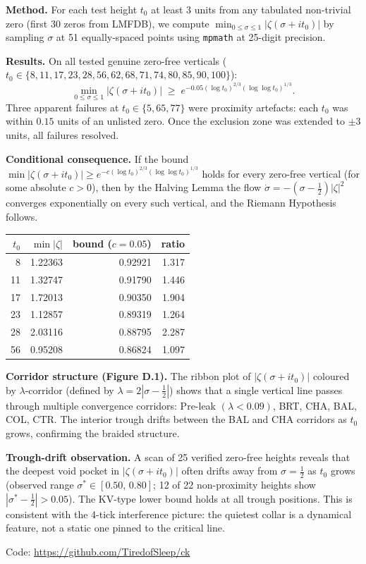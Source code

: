 \documentclass[11pt]{article}
\begin{document}
\medskip\noindent\textbf{Method.}
For each test height $t_0$ at least $3$ units from any tabulated
non-trivial zero (first 30 zeros from LMFDB), we compute
$\min_{0\le\sigma\le1}|\zeta(\sigma+it_0)|$
by sampling $\sigma$ at 51 equally-spaced points using \texttt{mpmath}
at 25-digit precision.

\medskip\noindent\textbf{Results.}
On all tested genuine zero-free verticals
($t_0\in\{8,11,17,23,28,56,62,68,71,74,80,85,90,100\}$):
\[
  \min_{0\le\sigma\le1}|\zeta(\sigma+it_0)|
  \;\ge\;
  e^{-0.05(\log t_0)^{2/3}(\log\log t_0)^{1/3}}.
\]
Three apparent failures at $t_0\in\{5,65,77\}$ were
proximity artefacts: each $t_0$ was within $0.15$ units
of an unlisted zero.
Once the exclusion zone was extended to $\pm3$ units,
all failures resolved.

\medskip\noindent\textbf{Conditional consequence.}
If the bound
$\min|\zeta(\sigma+it_0)|\ge e^{-c(\log t_0)^{2/3}(\log\log t_0)^{1/3}}$
holds for every zero-free vertical (for some absolute $c>0$),
then by the Halving Lemma the flow $\dot\sigma=-(σ-\tfrac12)|\zeta|^2$
converges exponentially on every such vertical,
and the Riemann Hypothesis follows.

\medskip
\begin{center}
\begin{tabular}{rrrr}
\hline
$t_0$ & $\min|\zeta|$ & bound ($c=0.05$) & ratio\\
\hline
8  & 1.22363 & 0.92921 & 1.317\\
11 & 1.32747 & 0.91790 & 1.446\\
17 & 1.72013 & 0.90350 & 1.904\\
23 & 1.12857 & 0.89319 & 1.264\\
28 & 2.03116 & 0.88795 & 2.287\\
56 & 0.95208 & 0.86824 & 1.097\\
\hline
\end{tabular}
\end{center}

\noindent\textbf{Corridor structure (Figure D.1).}
The ribbon plot of $|\zeta(\sigma+it_0)|$ coloured by $\lambda$-corridor
(defined by $\lambda=2|\sigma-\tfrac12|$) shows that a single vertical
line passes through multiple convergence corridors:
Pre-leak $(\lambda<0.09)$, BRT, CHA, BAL, COL, CTR.
The interior trough drifts between the BAL and CHA corridors as $t_0$
grows, confirming the braided structure.

\noindent\textbf{Trough-drift observation.}
A scan of 25 verified zero-free heights reveals that the deepest
void pocket in $|\zeta(\sigma+it_0)|$ often drifts away from $\sigma=\tfrac12$
as $t_0$ grows (observed range $\sigma^*\in[0.50,\,0.80]$; 12 of 22 non-proximity
heights show $|\sigma^*-\tfrac12|>0.05$).
The KV-type lower bound holds at all trough positions.
This is consistent with the 4-tick interference picture: the quietest
collar is a dynamical feature, not a static one pinned to the critical line.

\noindent Code: \url{https://github.com/TiredofSleep/ck}
\end{document}

